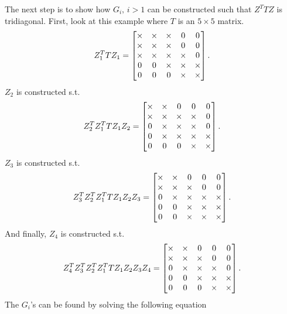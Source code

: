 The next step is to show how $G_i,\,i>1$ can be constructed such that $Z^TTZ$ is tridiagonal.
First, look at this example where $T$ is an $5\times 5$ matrix.
\begin{equation}
	Z_1 ^T T Z_1= 
\left[\begin{matrix} 
\times 	& \times & \times & 0 & 0   \\
\times 	& \times & \times & 0 & 0   \\
\times 	& \times & \times & \times & 0   \\
0 & 0 & \times & \times & \times     \\
0 & 0 & 0 & \times & \times    \\
 \end{matrix}\right]
.
\end{equation}
$Z_2$ is constructed s.t.
\begin{equation}
	Z_2^TZ_1 ^T T Z_1 Z_2 = 
\left[\begin{matrix} 
\times 	& \times & 0 & 0 & 0   \\
\times 	& \times & \times & \times & 0   \\
0 	& \times & \times & \times & 0    \\
0 & \times & \times & \times & \times   \\
0 & 0 & 0 & \times & \times  \\
 \end{matrix}\right]
.
\end{equation}
$Z_3$ is constructed s.t.
\begin{equation}
	Z_3^TZ_2^TZ_1 ^T T Z_1 Z_2 Z_3 = 
\left[\begin{matrix} 
\times 	& \times & 0 & 0 & 0   \\
\times 	& \times & \times & 0 & 0   \\
0 	& \times & \times & \times & \times    \\
0 & 0 & \times & \times & \times   \\
0 & 0 & \times & \times & \times  \\
 \end{matrix}\right]
.
\end{equation}
And finally, $Z_4$ is constructed s.t.
\begin{equation}
	Z_4^TZ_3^TZ_2^TZ_1 ^T T Z_1 Z_2 Z_3 Z_4= 
\left[\begin{matrix} 
\times 	& \times & 0 & 0 & 0   \\
\times 	& \times & \times & 0 & 0   \\
0 	& \times & \times & \times & 0    \\
0 & 0 & \times & \times & \times   \\
0 & 0 & 0 & \times & \times  \\
 \end{matrix}\right]
.
\end{equation}
The $G_i$'s can be found by solving the following equation
